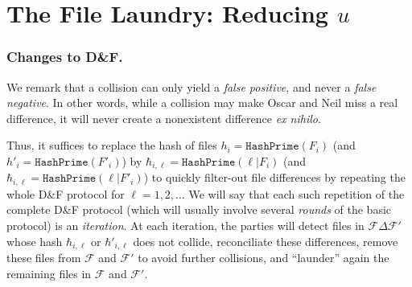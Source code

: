 \documentclass[twoside,envcountsame,runningheads]{llncs}
\newcommand{\Prob}[1]{{\Pr\left[\,{#1}\,\right]}}
\newcommand{\Files}{\mathcal{F}}
\newcommand{\df}{D\&F\xspace}
\newcommand{\eg}{\textit{e.g.}\xspace}
\newcommand{\HashPrime}{\ensuremath{\mathtt{HashPrime}}}
\begin{document}
%


\section{The File Laundry: Reducing $u$}
\label{ap:shortu}

\subsubsection{Changes to \df.}

We remark that a collision can only yield a \textit{false positive}, and never a \textit{false negative}. In other words, while a collision may make Oscar and Neil miss a real difference,
it will never create a nonexistent difference \textit{ex nihilo}.

Thus, it suffices to replace the hash of files $h_i = \HashPrime(F_i)$ (and $h'_i = \HashPrime(F'_i)$) by $\hbar_{i,\ell}=\HashPrime(\ell|F_i)$ (and $\hbar_{i,\ell} = \HashPrime(\ell|F'_i)$) to quickly filter-out file differences by repeating the whole \df protocol for $\ell=1,2,\ldots$ We will say that each such repetition of the complete \df protocol (which will usually involve several \emph{rounds} of the basic protocol) is an \emph{iteration}.
At each iteration, the parties will detect files in $\Files \Delta \Files'$ whose hash $\hbar_{i,\ell}$ or $\hbar'_{i,\ell}$ does not collide, reconciliate these differences, remove these files from $\Files$ and $\Files'$ to avoid further collisions, and ``launder'' again the remaining files in $\Files$ and $\Files'$.
\end{document}
